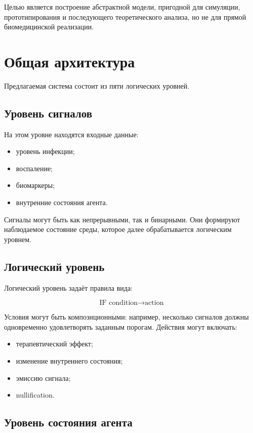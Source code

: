 \documentclass[12pt,a4paper]{article}
\begin{document}
Целью является построение абстрактной модели, пригодной для симуляции, прототипирования и последующего теоретического анализа, но не для прямой биомедицинской реализации.

\section{Общая архитектура}

Предлагаемая система состоит из пяти логических уровней.

\subsection{Уровень сигналов}

На этом уровне находятся входные данные:
\begin{itemize}
    \item уровень инфекции;
    \item воспаление;
    \item биомаркеры;
    \item внутренние состояния агента.
\end{itemize}

Сигналы могут быть как непрерывными, так и бинарными. Они формируют наблюдаемое состояние среды, которое далее обрабатывается логическим уровнем.

\subsection{Логический уровень}

Логический уровень задаёт правила вида:

\[
\text{IF condition} \rightarrow \text{action}
\]

Условия могут быть композиционными: например, несколько сигналов должны одновременно удовлетворять заданным порогам. Действия могут включать:
\begin{itemize}
    \item терапевтический эффект;
    \item изменение внутреннего состояния;
    \item эмиссию сигнала;
    \item nullification.
\end{itemize}

\subsection{Уровень состояния агента}
\end{document}
